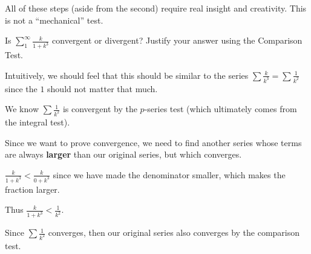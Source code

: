 \documentclass{ximera}
\begin{document}
All of these steps (aside from the second) require real insight and creativity.  This is not a ``mechanical'' test.

\begin{question}
Is $\sum_1^\infty \frac{k}{1+k^3}$ convergent or divergent?  Justify your answer using the Comparison Test.

\begin{multipleChoice}	
\end{multipleChoice}

\begin{hint}
	Intuitively, we should feel that this should be similar to the series $\sum \frac{k}{k^3} = \sum \frac{1}{k^2}$ since the $1$ should not matter that much.
	
	We know $\sum \frac{1}{k^2}$ is convergent by the $p$-series test (which ultimately comes from the integral test).
	
	Since we want to prove convergence, we need to find another series whose terms are always \textbf{larger} than our original series, but which converges. 
\end{hint}

\begin{hint}
	 $\frac{k}{1+k^3} < \frac{k}{0+k^3}$ since we have made the denominator smaller, which makes the fraction larger.
	 
	 Thus $\frac{k}{1+k^3} < \frac{1}{k^2}$.
	 
	 Since $\sum \frac{1}{k^2}$ converges, then our original series also converges by the comparison test.
\end{hint}

\end{question}
\end{document}
